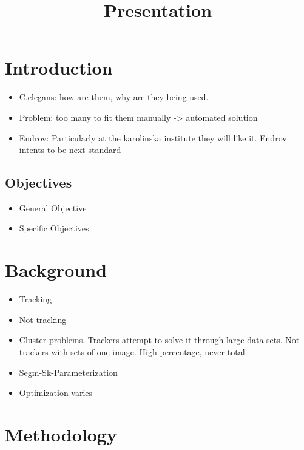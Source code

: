 \documentclass[12pt,letterpaper,oneside]{book}
\title{Presentation}
\begin{document}
\section*{Introduction}

\begin{itemize}
\item C.elegans: how are them, why are they being used.
\item Problem: too many to fit them manually -> automated solution
\item Endrov: Particularly at the karolinska institute they will
  like it. Endrov intents to be next standard
\end{itemize}

\subsection*{Objectives}
\begin{itemize}
\item General Objective
\item Specific Objectives
\end{itemize}

\section*{Background}
\begin{itemize}
\item Tracking
\item Not tracking
\item Cluster problems. Trackers attempt to solve it through
  large data sets. Not trackers with sets of one image. High
  percentage, never total.
\item Segm-Sk-Parameterization
\item Optimization varies
\end{itemize}

\section*{Methodology}
\end{document}
